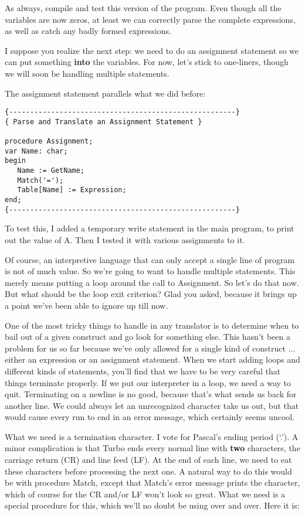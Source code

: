 As always, compile and test this version of the  program. Even though all the variables are now zeros, at least we can correctly parse the complete expressions, as well as catch any badly formed expressions.

I suppose you realize the next step: we need to do  an assignment statement so we can  put  something {\bfseries into} the variables. For now, let's  stick  to  one-liners, though  we will soon  be  handling multiple statements.

The assignment statement parallels what we did before:

\begin{verbatim}
{------------------------------------------------------}
{ Parse and Translate an Assignment Statement }

procedure Assignment;
var Name: char;
begin
   Name := GetName;
   Match('=');
   Table[Name] := Expression;
end;
{------------------------------------------------------}
\end{verbatim}

To test this, I  added  a  temporary write statement in the main program, to  print out the value of A. Then I  tested  it  with various assignments to it.

Of course, an interpretive language that can only accept a single line of program  is not of much value. So we're going to want to handle multiple statements. This  merely  means  putting  a loop around  the  call  to Assignment. So let's do that now. But what should be the loop exit criterion?  Glad you  asked, because  it brings up a point we've been able to ignore up till now.

One of the most tricky things  to  handle in any translator is to determine when to bail out of  a  given construct and go look for something else. This hasn't been a problem for us so far because we've only allowed for  a  single kind of construct ... either an expression  or an assignment statement. When  we  start  adding loops and different kinds of statements, you'll find that we have to be very careful that things terminate properly. If we put our interpreter in a loop, we need a way to quit. Terminating on a newline is no good, because that's what sends us back for another line. We could always let an unrecognized character take us out, but that would cause every run to end in an error  message, which certainly seems uncool.

What we need  is  a  termination  character. I vote for Pascal's ending period (`.'). A  minor  complication  is that Turbo ends every normal line  with {\bfseries two} characters, the carriage return (CR) and line feed (LF). At  the  end  of  each line, we need to eat these characters before processing the next one. A  natural way to do this would  be  with  procedure  Match, except that Match's error  message  prints  the character, which of course for the CR and/or  LF won't look so great. What we need is a special procedure for this, which we'll no doubt be using over and over. Here it is:

